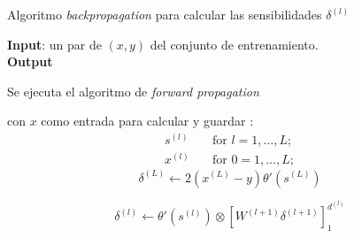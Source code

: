 \begin{algorithm}[H]
    \caption{Algoritmo \textit{backpropagation} para calcular
    las sensibilidades $\delta^{(l)}$}
    \hspace*{\algorithmicindent} \textbf{Input}: un par de $(x,y)$ del conjunto de entrenamiento.  \\
    \hspace*{\algorithmicindent} \textbf{Output} 
    \begin{algorithmic}[1]
        \STATE Se ejecuta el algoritmo de \textit{forward propagation} 
        
        con $x$ como entrada para calcular y guardar : 
        \begin{align}
            s^{(l)} \quad &\text{for } l = 1, \ldots, L;
            \\
            x^{(l)} \quad &\text{for } 0 = 1, \ldots, L;
        \end{align}
        \STATE {}
        \begin{equation}
            \delta^{(L)} \longleftarrow 2
            \left( 
                x^{(L)} - y
            \right)
            \theta' \left( s^{(L)} \right)
        \end{equation}
        \STATE 
        
        {
            \begin{equation}
                \delta^{(l)} 
                    \leftarrow
                \theta' 
                \left(
                    s^{(l)}
                \right)
                \otimes
                \left[
                    W^{(l+1)}
                    \delta^{(l+1)}
                \right]^{d^{(l)}}_1
            \end{equation}
        }
\end{algorithmic}
\end{algorithm}

